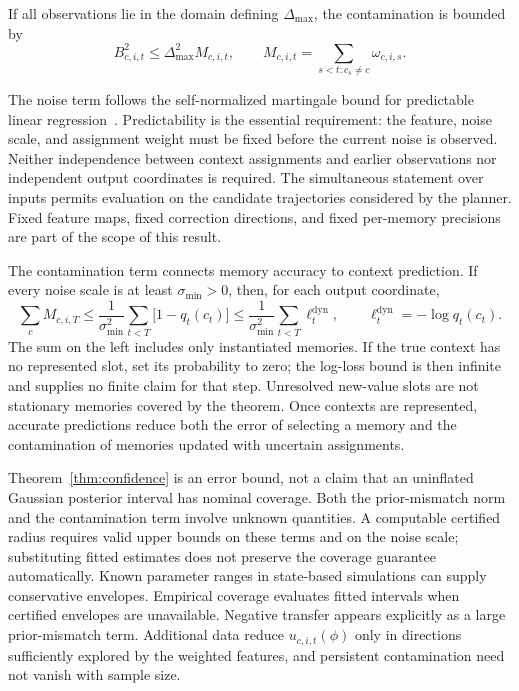 If all observations lie in the domain defining $\Delta_{\max}$, the contamination is bounded by
\[
B_{c,i,t}^2\leq\Delta_{\max}^2 M_{c,i,t},\qquad
M_{c,i,t}=\sum_{s<t:c_s\ne c}\omega_{c,i,s}.
\]

The noise term follows the self-normalized martingale bound for predictable linear regression~\citep{abbasi2011improved}. Predictability is the essential requirement: the feature, noise scale, and assignment weight must be fixed before the current noise is observed. Neither independence between context assignments and earlier observations nor independent output coordinates is required. The simultaneous statement over inputs permits evaluation on the candidate trajectories considered by the planner. Fixed feature maps, fixed correction directions, and fixed per-memory precisions are part of the scope of this result.

The contamination term connects memory accuracy to context prediction. If every noise scale is at least $\sigma_{\min}>0$, then, for each output coordinate,
\begin{equation}
\sum_c M_{c,i,T}
\leq\frac{1}{\sigma_{\min}^2}\sum_{t<T}\bigl[1-q_t(c_t)\bigr]
\leq\frac{1}{\sigma_{\min}^2}\sum_{t<T}\ell_t^{\mathrm{dyn}},
\qquad \ell_t^{\mathrm{dyn}}=-\log q_t(c_t).
\label{eq:contamination-logloss}
\end{equation}
The sum on the left includes only instantiated memories. If the true context has no represented slot, set its probability to zero; the log-loss bound is then infinite and supplies no finite claim for that step. Unresolved new-value slots are not stationary memories covered by the theorem. Once contexts are represented, accurate predictions reduce both the error of selecting a memory and the contamination of memories updated with uncertain assignments.

Theorem~\ref{thm:confidence} is an error bound, not a claim that an uninflated Gaussian posterior interval has nominal coverage. Both the prior-mismatch norm and the contamination term involve unknown quantities. A computable certified radius requires valid upper bounds on these terms and on the noise scale; substituting fitted estimates does not preserve the coverage guarantee automatically. Known parameter ranges in state-based simulations can supply conservative envelopes. Empirical coverage evaluates fitted intervals when certified envelopes are unavailable. Negative transfer appears explicitly as a large prior-mismatch term. Additional data reduce $u_{c,i,t}(\phi)$ only in directions sufficiently explored by the weighted features, and persistent contamination need not vanish with sample size.

